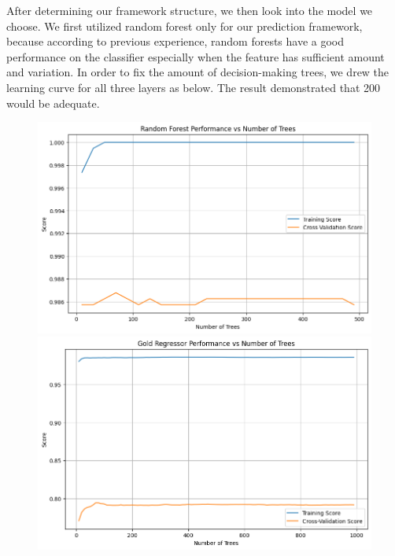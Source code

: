 \documentclass[12pt]{article}
\begin{document}
After determining our framework structure, we then look into the model we choose. We first utilized random forest only for our prediction framework, because according to previous experience, random forests have a good performance on the classifier especially when the feature has sufficient amount and variation. In order to fix the amount of decision-making trees, we drew the learning curve for all three layers as below. The result demonstrated that 200 would be adequate.\\

\begin{figure}[h]
	\begin{minipage}[b]{0.33\textwidth}
		\centering
		\includegraphics[width=1\textwidth]{figure/random_forest.png}
	\end{minipage}
	\begin{minipage}[b]{0.33\textwidth}
		\centering
		\includegraphics[width=1\textwidth]{figure/random_forest_gold_medal.png}
	\end{minipage}

\end{figure}
\end{document}
